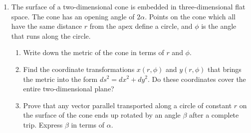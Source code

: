 \documentclass{article}
\begin{document}
\begin{enumerate}
\item The surface of a two-dimensional cone is embedded in three-dimensional flat space. The cone has an opening angle of $2\alpha$. Points on the cone which all have the same distance $r$ from the apex define a circle, and $\phi$ is the angle that runs along the circle.
  \begin{enumerate}
  \item Write down the metric of the cone in terms of $r$ and $\phi$.
  \item Find the coordinate transformations $x(r, \phi)$ and $y(r, \phi)$ that brings the metric into the form $ds^2 = dx^2 + dy^2$. Do these coordinates cover the entire two-dimensional plane?
  \item Prove that any vector parallel transported along a circle of constant $r$ on the surface of the cone ends up rotated by an angle $\beta$ after a complete trip. Express $\beta$ in terms of $\alpha$.
  \end{enumerate}
\end{enumerate}
\end{document}
